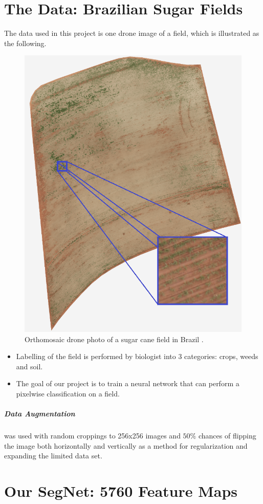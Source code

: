 \documentclass[
    ,title     = {{Image Segmentation for Smart Agriculture}}
    ,subject   = {{This is the subject of my work}}
    ,papersize = {{a1paper}}
    ,nocrop
]{dtuposter}
\begin{document}
\begin{dtupostercontent}
\section{The Data: Brazilian Sugar Fields}
The data used in this project is one drone image of a field, which is illustrated as the following.
\begin{figure}
\centering
\includegraphics[width=.7\linewidth]{raw-min3}
\caption{Orthomosaic drone photo of a sugar cane field in Brazil \cite{USC}.}
\end{figure}
\begin{itemize}
	\item Labelling of the field is performed by biologist into 3 categories: crops, weeds and soil.
	\item The goal of our project is to train a neural network that can perform a pixelwise classification on a field.
\end{itemize}
\subparagraph{Data Augmentation} was used with random croppings to 256x256 images and \(50 \%\) chances of flipping the image both horizontally and vertically as a method for regularization and expanding the limited data set.
\section{Our SegNet: 5760 Feature Maps}




\end{dtupostercontent}
\end{document}
